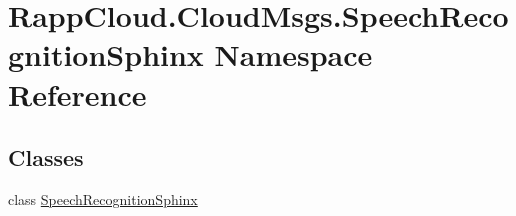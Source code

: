 \hypertarget{namespaceRappCloud_1_1CloudMsgs_1_1SpeechRecognitionSphinx}{\section{Rapp\-Cloud.\-Cloud\-Msgs.\-Speech\-Recognition\-Sphinx Namespace Reference}
\label{namespaceRappCloud_1_1CloudMsgs_1_1SpeechRecognitionSphinx}
}
\subsection*{Classes}
\begin{DoxyCompactItemize}
\item 
class \hyperlink{classRappCloud_1_1CloudMsgs_1_1SpeechRecognitionSphinx_1_1SpeechRecognitionSphinx}{Speech\-Recognition\-Sphinx}
\end{DoxyCompactItemize}
